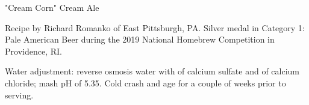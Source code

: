 \begin{recipe}{"Cream Corn" Cream Ale}

\begin{aboutblock}
Recipe by Richard Romanko of East Pittsburgh, PA. Silver medal in Category
1: Pale American Beer during the 2019 National Homebrew Competition
in Providence, RI. \sourceaha
\end{aboutblock}
 

\begin{methodandtiming}
 
\begin{mashsteps}
\end{mashsteps}

\begin{directions}
Water adjustment: reverse osmosis water with  of calcium sulfate
and  of calcium chloride; mash pH of 5.35. Cold crash and age for
a couple of weeks prior to serving.
\end{directions}

\end{methodandtiming}

\recipebreak

\begin{ingredientsblock}

\begin{malts}
\end{malts}

\begin{hops}
\end{hops}


\end{ingredientsblock}

\end{recipe}

